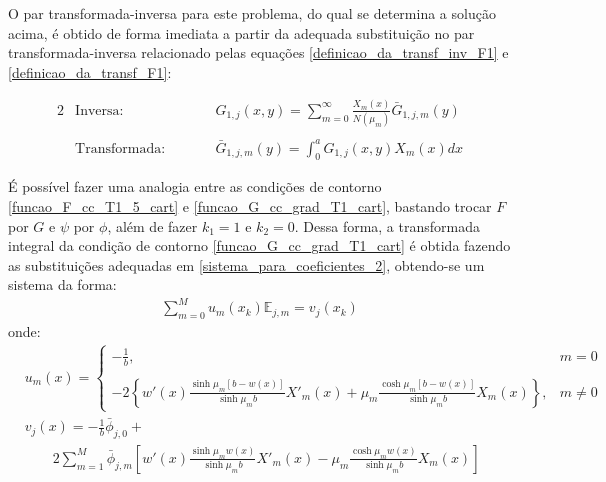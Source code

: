O par transformada-inversa para este problema, do qual se determina a solução acima, é obtido de forma imediata a partir da adequada substituição no par transformada-inversa relacionado pelas equações \eqref{definicao_da_transf_inv_F1} e \eqref{definicao_da_transf_F1}:
\begin{fleqn}
	\begin{alignat}{2}
	& \text{Inversa:} && G_{1, j}(x, y) = \sum_{m=0}^\infty \frac{X_m(x)}{N(\mu_m)}\bar{G}_{1,j,m}(y) \label{definicao_da_transf_inv_G1} \\ \nonumber \\
	& \text{Transformada:} \quad\quad && \bar{G}_{1,j,m}(y) = \int_0^a G_{1, j}(x, y) X_m(x) dx \label{definicao_da_transf_G1}
	\end{alignat}
\end{fleqn}

É possível fazer uma analogia entre as condições de contorno \eqref{funcao_F_cc_T1_5_cart} e \eqref{funcao_G_cc_grad_T1_cart}, bastando trocar $F$ por $G$ e $\psi$ por $\phi$, além de fazer $k_1 = 1$ e $k_2 = 0$. Dessa forma, a transformada integral da condição de contorno \eqref{funcao_G_cc_grad_T1_cart} é obtida fazendo as substituições adequadas em \eqref{sistema_para_coeficientes_2}, obtendo-se um sistema da forma:
\begin{align}
\sum_{m = 0}^M u_m(x_k) \mathbb{E}_{j,m} = v_{j}(x_k) 
\label{sistema_para_coeficientes_20}
\end{align}
onde:
\begin{align}
& u_m(x) = \left\lbrace
\begin{array}{ll}
\displaystyle -\frac{1}{b}, & m = 0 \\ \\
\displaystyle -2\left\lbrace w'(x)\frac{\sinh\mu_m [b - w(x)]}{\sinh\mu_m b}X'_m(x) +   \mu_m\frac{\cosh\mu_m [b - w(x)]}{\sinh\mu_m b}X_m(x)\right\rbrace, & m \ne 0
\end{array}
\right.  \label{compacta_p2} \\
&
v_{j}(x) = -\frac{1}{b}\bar{\phi}_{j,0} + \nonumber \\
& \quad\quad  2 \sum_{m=1}^M \bar{\phi}_{j, m}\left[ w'(x)\frac{\sinh\mu_m w(x)}{\sinh\mu_m b}X'_m(x) -  \mu_m\frac{\cosh\mu_m w(x)}{\sinh\mu_m b}X_m(x)\right] \label{compacta_r2}
\end{align}

